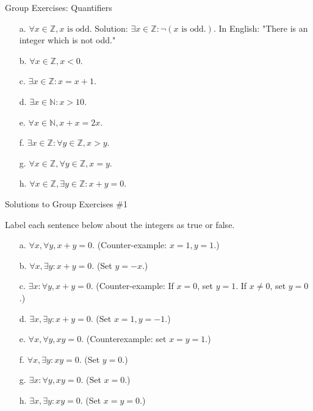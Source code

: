 \documentclass[10pt]{beamer}
\begin{document}
\begin{frame}{Group Exercises: Quantifiers}
\begin{minipage}{0.38\textwidth}
\begin{itemize}
        \item[a.] $\forall x \in \mathbb{Z}, x \text{ is odd.} $  \alert{Solution: $\exists x \in \mathbb{Z}: \lnot (x \text{ is odd}.)$. In English: "There is an integer which is not odd."}
        \item[b.] $\forall x \in \mathbb{Z}, x<0.$ 
        \item[c.] $\exists x \in \mathbb{Z}: x=x+1.$
        \item[d.] $\exists x \in \mathbb{N}: x>10.$
        \item[e.] $\forall x \in \mathbb{N}, x+x=2x.$
        \item[f.] $\exists x \in \mathbb{Z}: \forall y \in \mathbb{Z}, x>y.$
        \item[g.]  $\forall x \in \mathbb{Z}, \forall y \in \mathbb{Z}, x=y.$
        \item[h.] $\forall x \in \mathbb{Z}, \exists y \in \mathbb{Z}: x+y=0.$
    \end{itemize}
\end{minipage}

\end{frame}

\begin{frame}{Solutions to Group Exercises \#1}

 Label each sentence below about the integers as true or false. 
    \begin{itemize}
        \item[a.] $\forall x, \forall y, x+y=0.$     (Counter-example: $x=1, y=1$.)
        \item[b.] $\forall x, \exists y: x+y=0.$    (Set $y=-x$.) 
        \item[c.] $\exists x: \forall y, x+y=0.$     (Counter-example: If $x=0$, set $y=1$. If $x \neq 0$, set $y=0$.)
        \item[d.] $\exists x, \exists y: x+y=0.$    (Set $x=1,y=-1$.)
        \item[e.] $\forall x, \forall y, xy=0.$     (Counterexample: set $x=y=1$.)
        \item[f.] $\forall x, \exists y: xy=0.$    (Set $y=0$.)
        \item[g.] $\exists x: \forall y, xy=0.$    (Set $x=0$.)
        \item[h.] $\exists x, \exists y: xy=0.$    (Set $x=y=0$.)
    \end{itemize}


\end{frame}
\end{document}
